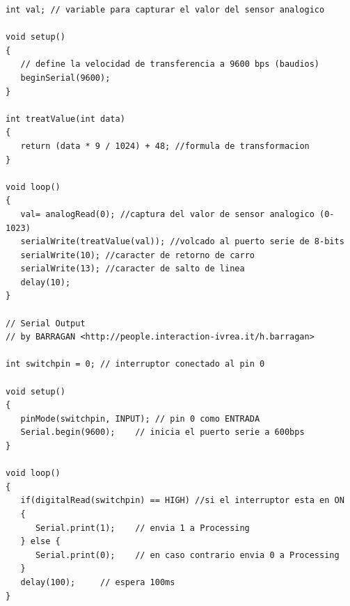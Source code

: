 \begin{lstlisting}
int val; // variable para capturar el valor del sensor analogico

void setup()
{
   // define la velocidad de transferencia a 9600 bps (baudios)
   beginSerial(9600);
}

int treatValue(int data)
{
   return (data * 9 / 1024) + 48; //formula de transformacion
}

void loop()
{
   val= analogRead(0); //captura del valor de sensor analogico (0-1023)
   serialWrite(treatValue(val)); //volcado al puerto serie de 8-bits
   serialWrite(10); //caracter de retorno de carro
   serialWrite(13); //caracter de salto de linea
   delay(10); 
}

// Serial Output 
// by BARRAGAN <http://people.interaction-ivrea.it/h.barragan>

int switchpin = 0; // interruptor conectado al pin 0

void setup()
{
   pinMode(switchpin, INPUT); // pin 0 como ENTRADA
   Serial.begin(9600);    // inicia el puerto serie a 600bps
}

void loop()
{
   if(digitalRead(switchpin) == HIGH) //si el interruptor esta en ON
   {
      Serial.print(1);    // envia 1 a Processing
   } else {
      Serial.print(0);    // en caso contrario envia 0 a Processing
   }
   delay(100);     // espera 100ms
}
\end{lstlisting}